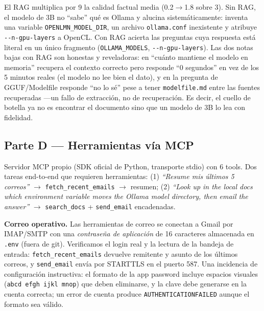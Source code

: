 \documentclass[conference]{IEEEtran}
\begin{document}
El RAG multiplica por 9 la calidad factual media (0.2$\rightarrow$1.8 sobre 3).
Sin RAG, el modelo de 3B no ``sabe'' qué es Ollama y alucina sistemáticamente:
inventa una variable \texttt{OPENLMN\_MODEL\_DIR}, un archivo
\texttt{ollama.conf} inexistente y atribuye \texttt{-{}-n-gpu-layers} a OpenCL.
Con RAG acierta las preguntas cuya respuesta está literal en un único fragmento
(\texttt{OLLAMA\_MODELS}, \texttt{-{}-n-gpu-layers}). Las dos notas bajas con RAG
son honestas y reveladoras: en ``cuánto mantiene el modelo en memoria'' recupera
el contexto correcto pero responde ``0 segundos'' en vez de los 5 minutos reales
(el modelo no lee bien el dato), y en la pregunta de GGUF/Modelfile responde
``no lo sé'' pese a tener \texttt{modelfile.md} entre las fuentes recuperadas
---un fallo de extracción, no de recuperación. Es decir, el cuello de botella ya
no es encontrar el documento sino que un modelo de 3B lo lea con fidelidad.

\subsection{Parte D --- Herramientas vía MCP}

Servidor MCP propio (SDK oficial de Python, transporte stdio) con 6 tools. Dos
tareas end-to-end que requieren herramientas: (1) \emph{``Resume mis últimos 5
correos''} $\rightarrow$ \texttt{fetch\_recent\_emails} $\rightarrow$ resumen;
(2) \emph{``Look up in the local docs which environment variable moves the
Ollama model directory, then email the answer''} $\rightarrow$
\texttt{search\_docs} + \texttt{send\_email} encadenadas.

\textbf{Correo operativo.} Las herramientas de correo se conectan a Gmail por
IMAP/SMTP con una \emph{contraseña de aplicación} de 16 caracteres almacenada en
\texttt{.env} (fuera de git). Verificamos el login real y la lectura de la
bandeja de entrada: \texttt{fetch\_recent\_emails} devuelve remitente y asunto de
los últimos correos, y \texttt{send\_email} envía por STARTTLS en el puerto 587.
Una incidencia de configuración instructiva: el formato de la app password
incluye espacios visuales (\texttt{abcd efgh ijkl mnop}) que deben eliminarse, y
la clave debe generarse en la cuenta correcta; un error de cuenta produce
\texttt{AUTHENTICATIONFAILED} aunque el formato sea válido.
\end{document}
